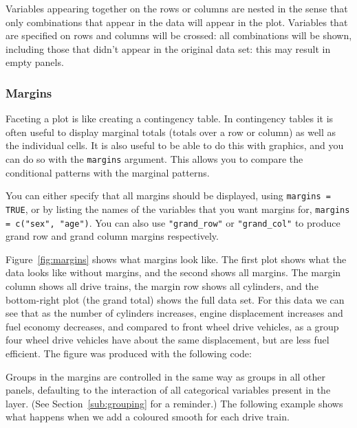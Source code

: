 Variables appearing together on the rows or columns are nested in the sense that only combinations that appear in the data will appear in the plot.  Variables that are specified on rows and columns will be crossed: all combinations will be shown, including those that didn't appear in the original data set: this may result in empty panels.

\subsubsection{Margins}\label{sub:margins}

Faceting a plot is like creating a contingency table.  In contingency tables it is often useful to display marginal totals (totals over a row or column) as well as the individual cells.  It is also useful to be able to do this with graphics, and you can do so with the {\tt margins} argument.  This allows you to compare the conditional patterns with the marginal patterns.

You can either specify that all margins should be displayed, using {\tt margins = TRUE}, or by listing the names of the variables that you want margins for, {\tt margins = c("sex", "age")}.  You can also use \verb|"grand_row"| or \verb|"grand_col"| to produce grand row and grand column margins respectively.  

Figure~\ref{fig:margins} shows what margins look like.  The first plot shows what the data looks like without margins, and the second shows all margins.  The margin column shows all drive trains, the margin row shows all cylinders, and the bottom-right plot (the grand total) shows the full data set.  For this data we can see that as the number of cylinders increases, engine displacement increases and fuel economy decreases, and compared to front wheel drive vehicles, as a group four wheel drive vehicles have about the same displacement, but are less fuel efficient.  The figure was produced with the following code:

% 


Groups in the margins are controlled in the same way as groups in all other panels, defaulting to the interaction of all categorical variables present in the layer.  (See Section~\ref{sub:grouping} for a reminder.)  The following example shows what happens when we add a coloured smooth for each drive train. 

